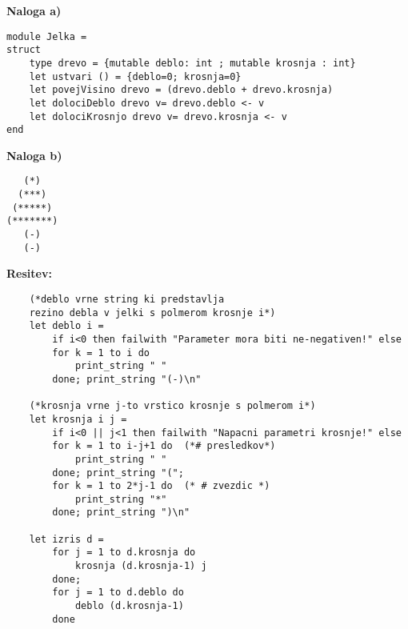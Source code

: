 \begin{Odgovor}{5.4}

\textbf{Naloga a)}
\begin{lstlisting}
module Jelka =
struct
    type drevo = {mutable deblo: int ; mutable krosnja : int}
    let ustvari () = {deblo=0; krosnja=0}
    let povejVisino drevo = (drevo.deblo + drevo.krosnja)
    let dolociDeblo drevo v= drevo.deblo <- v
    let dolociKrosnjo drevo v= drevo.krosnja <- v
end
\end{lstlisting}
\textbf{Naloga b)}
\begin{lstlisting}
   (*)
  (***)
 (*****)
(*******)
   (-)
   (-)
\end{lstlisting}
\textbf{Resitev:}
\begin{lstlisting}
    (*deblo vrne string ki predstavlja
    rezino debla v jelki s polmerom krosnje i*)
    let deblo i =
        if i<0 then failwith "Parameter mora biti ne-negativen!" else
        for k = 1 to i do
            print_string " "
        done; print_string "(-)\n"

    (*krosnja vrne j-to vrstico krosnje s polmerom i*)
    let krosnja i j =
        if i<0 || j<1 then failwith "Napacni parametri krosnje!" else
        for k = 1 to i-j+1 do  (*# presledkov*)
            print_string " "
        done; print_string "(";
        for k = 1 to 2*j-1 do  (* # zvezdic *)
            print_string "*"
        done; print_string ")\n"

    let izris d =
        for j = 1 to d.krosnja do
            krosnja (d.krosnja-1) j
        done;
        for j = 1 to d.deblo do
            deblo (d.krosnja-1)
        done
\end{lstlisting}

\end{Odgovor}
